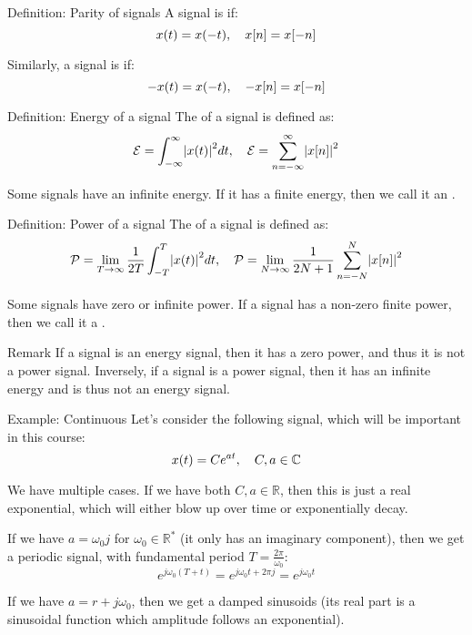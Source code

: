 \documentclass[a4paper]{article}
\begin{document}
\begin{parag}{Definition: Parity of signals}
    A signal is  if: 
    \[x\left(t\right) = x\left(-t\right), \mathspace x\left[n\right] = x\left[-n\right]\]
    
    Similarly, a signal is  if: 
    \[-x\left(t\right) = x\left(-t\right), \mathspace -x\left[n\right] = x\left[-n\right]\]
\end{parag}

\begin{parag}{Definition: Energy of a signal}
    The  of a signal is defined as: 
    \[\mathcal{E} = \int_{-\infty}^{\infty} \left|x\left(t\right)\right|^2 dt, \mathspace \mathcal{E} = \sum_{n=-\infty}^{\infty} \left|x\left[n\right]\right|^2\]

    Some signals have an infinite energy. If it has a finite energy, then we call it an .
\end{parag}

\begin{parag}{Definition: Power of a signal}
    The  of a signal is defined as: 
    \[\mathcal{P} = \lim_{T \to \infty} \frac{1}{2T} \int_{-T}^{T} \left|x\left(t\right)\right|^2dt, \mathspace \mathcal{P} = \lim_{N \to \infty} \frac{1}{2N + 1} \sum_{n=-N}^{N} \left|x\left[n\right]\right|^2\]

    Some signals have zero or infinite power. If a signal has a non-zero finite power, then we call it a .

    \begin{subparag}{Remark}
        If a signal is an energy signal, then it has a zero power, and thus it is not a power signal. Inversely, if a signal is a power signal, then it has an infinite energy and is thus not an energy signal.
    \end{subparag}
\end{parag}

\begin{parag}{Example: Continuous}
    Let's consider the following signal, which will be important in this course: 
    \[x\left(t\right) = C e^{a t}, \mathspace C, a \in \mathbb{C}\]
    
    We have multiple cases. If we have both $C, a \in \mathbb{R}$, then this is just a real exponential, which will either blow up over time or exponentially decay.

    If we have $a = \omega_0 j$ for $\omega_0 \in \mathbb{R}^*$ (it only has an imaginary component), then we get a periodic signal, with fundamental period $T = \frac{2\pi}{\omega_0}$:  
    \[e^{j \omega_0 \left(T + t\right)} = e^{j \omega_0 t + 2\pi j} = e^{j \omega_0 t}\]
    
    If we have $a = r + j \omega_0$, then we get a damped sinusoids (its real part is a sinusoidal function which amplitude follows an exponential).
\end{parag}
\end{document}
